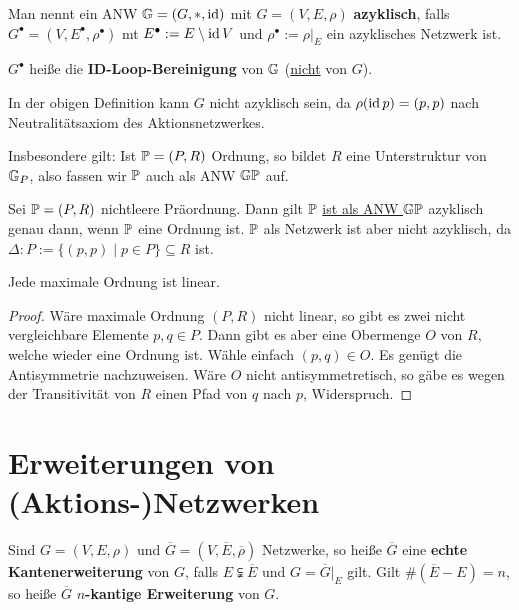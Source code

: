 \begin{definition}
    Man nennt ein ANW $\G = (G, \ast, \id)$ mit $G=(V,E,\rho)$ \textbf{azyklisch}, falls 
    $G^\bullet =(V,E^\bullet, \rho^\bullet)$ mt $E^\bullet := E \setminus \id V$ und $\rho^\bullet := \rho|_E$
    ein azyklisches Netzwerk ist.

    $G^\bullet$ heiße die \textbf{ID-Loop-Bereinigung} von $\G$ (\underline{nicht} von $G$).
\end{definition}

\begin{bemerkungnr}
    In der obigen Definition kann $G$ nicht azyklisch sein, da $\rho(\id p) = (p,p)$ nach Neutralitätsaxiom des Aktionsnetzwerkes.
\end{bemerkungnr}

\begin{bemerkungnr}
    Insbesondere gilt: Ist $\P = (P,R)$ Ordnung, so bildet $R$ eine Unterstruktur von $\G_P$, 
    also fassen wir $\P$ auch als ANW $\G\P$ auf.
\end{bemerkungnr}

\begin{beispiel}
    Sei $\P=(P,R)$ nichtleere Präordnung. Dann gilt $\P$ \underline{ist als ANW $\G\P$} azyklisch genau
    dann, wenn $\P$ eine Ordnung ist. $\P$ als Netzwerk ist aber nicht azyklisch, da 
    $\Delta:P := \{(p,p) \mid p \in P\} \subseteq R$ ist.
\end{beispiel}

\begin{satz}
    Jede maximale Ordnung ist linear.
\end{satz}
\begin{proof}
    Wäre maximale Ordnung $(P,R)$ nicht linear, so gibt es zwei nicht vergleichbare Elemente $p,q \in P$.
    Dann gibt es aber eine Obermenge $O$ von $R$, welche wieder eine Ordnung ist.
    Wähle einfach $(p,q) \in O$. 
    Es genügt die Antisymmetrie nachzuweisen.
    Wäre $O$ nicht antisymmetretisch, so gäbe es wegen der Transitivität von $R$ einen Pfad von $q$ nach $p$, Widerspruch.
\end{proof}

\section{Erweiterungen von (Aktions-)Netzwerken}
\begin{definition}
    Sind $G=(V,E,\rho)$ und $\overline{G} = (V, \overline{E}, \overline{\rho})$ Netzwerke, so heiße
    $\overline{G}$ eine \textbf{echte Kantenerweiterung} von $G$, falls $E \subsetneqq \overline{E}$ und $G = \overline{G}|_E$ gilt.
    Gilt $\#(\overline{E}-E) = n$, so heiße $\overline{G}$ \textbf{$n$-kantige Erweiterung} von $G$.
\end{definition}

